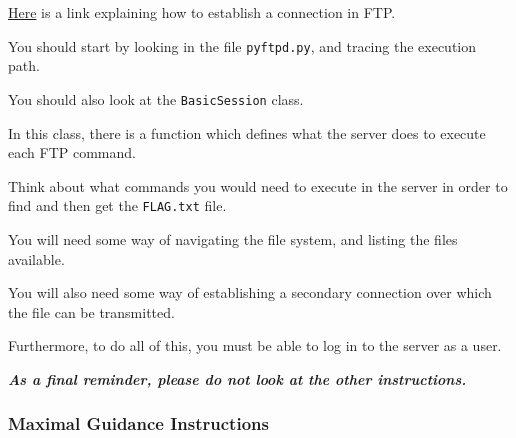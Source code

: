 {{{                    \href{https://www.serv-u.com/resource/tutorial/pasv-response-epsv-port-pbsz-rein-ftp-command#fac52a38-7ddb-4815-a9dc-72cc03c0a8e6}{Here} is a link explaining how to establish a connection in FTP.







                    You should start by looking in the file \lstinline`pyftpd.py`, and tracing the execution path. %



You should also look at the \lstinline`BasicSession` class. %



In this class, there is a function which defines what the server does to execute each FTP command. %



Think about what commands you would need to execute in the server in order to find and then get the \lstinline`FLAG.txt` file. 







                    You will need some way of navigating the file system, and listing the files available. %



You will also need some way of establishing a secondary connection over which the file can be transmitted. %



Furthermore, to do all of this, you must be able to log in to the server as a user. 







                    \textbf{\textit{As a final reminder, please do not look at the other instructions.}}



            }



        \newpage



        \subsubsection{Maximal Guidance Instructions}



            {\parindent0pt\singlespacing



}}}
